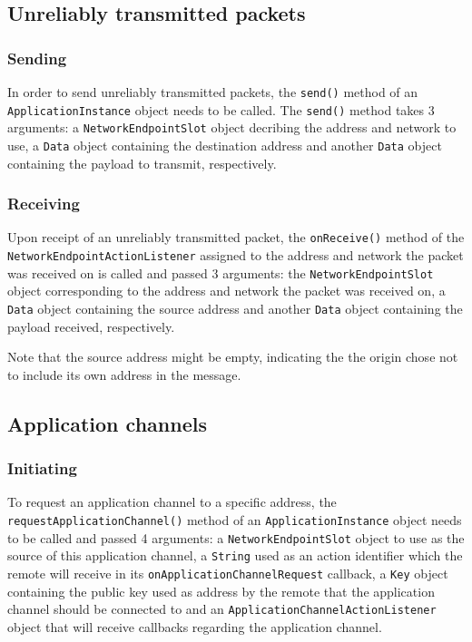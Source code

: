 \documentclass[a4paper,twocolumn]{article}
\newcommand{\code}[1]{\texttt{#1}}
\begin{document}
\subsection*{Unreliably transmitted packets}
\subsubsection*{Sending}
In order to send unreliably transmitted packets, the \code{send()} method of an
\code{ApplicationInstance} object needs to be called.
The \code{send()} method takes 3 arguments: a \code{NetworkEndpointSlot} object
decribing the address and network to use, a \code{Data} object containing the
destination address and another \code{Data} object containing the payload to
transmit, respectively.

\subsubsection*{Receiving}
Upon receipt of an unreliably transmitted packet, the \code{onReceive()} method
of the \code{NetworkEndpointActionListener} assigned to the address and network
the packet was received on is called and passed 3 arguments:
the \code{NetworkEndpointSlot} object corresponding to the address and network
the packet was received on, a \code{Data} object containing the source address
and another \code{Data} object containing the payload received, respectively.

Note that the source address might be empty, indicating the the origin chose not
to include its own address in the message.

\subsection*{Application channels}
\subsubsection*{Initiating}
To request an application channel to a specific address, the
\code{requestApplicationChannel()} method of an \code{ApplicationInstance}
object needs to be called and passed 4 arguments: a \code{NetworkEndpointSlot}
object to use as the source of this application channel, a \code{String} used as
an action identifier which the remote will receive in its
\code{onApplicationChannelRequest} callback, a \code{Key} object containing the
public key used as address by the remote that the application channel should be
connected to and an \code{ApplicationChannelActionListener} object that will
receive callbacks regarding the application channel.
\end{document}
